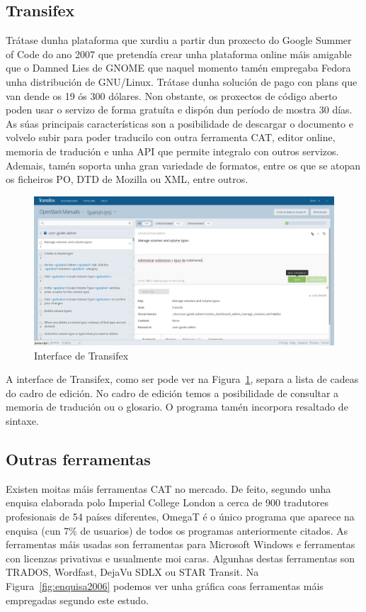 \subsection{Transifex}
Trátase dunha plataforma que xurdiu a partir dun proxecto do Google Summer of Code do ano 2007 que pretendía crear unha plataforma online máis amigable que o Damned Lies de GNOME que naquel momento tamén empregaba Fedora unha distribución de GNU/Linux. Trátase dunha solución de pago con plans que van dende os 19 ós 300 dólares. Non obstante, os proxectos de código aberto poden usar o servizo de forma gratuíta e dispón dun período de mostra 30 días. As súas principais características son a posibilidade de descargar o documento e volvelo subir para poder traducilo con outra ferramenta CAT, editor online, memoria de tradución e unha API que permite integralo con outros servizos. Ademais, tamén soporta unha gran variedade de formatos, entre os que se atopan os ficheiros PO, DTD de Mozilla ou XML, entre outros.

\begin{figure}[h]
    \centering
    \includegraphics[width=\textwidth]{img/captura_transifex.png}
    \caption{Interface de Transifex}
    \label{fig:transifex}
\end{figure}

A interface de Transifex, como ser pode ver na Figura~\ref{fig:transifex}, separa a lista de cadeas do cadro de edición. No cadro de edición temos a posibilidade de consultar a memoria de tradución ou o glosario. O programa tamén incorpora resaltado de sintaxe.

\subsection{Outras ferramentas}
Existen moitas máis ferramentas CAT no mercado. De feito, segundo unha enquisa \cite{article:2006survey} elaborada polo Imperial College London a cerca de 900 tradutores profesionais de 54 países diferentes, OmegaT é o único programa que aparece na enquisa (cun 7\% de usuarios) de todos os programas anteriormente citados. As ferramentas máis usadas son ferramentas para Microsoft Windows e ferramentas con licenzas privativas e usualmente moi caras. Algunhas destas ferramentas son TRADOS, Wordfast, DejaVu SDLX ou STAR Transit. Na Figura~\ref{fig:enquisa2006} podemos ver unha gráfica coas ferramentas máis empregadas segundo este estudo.

